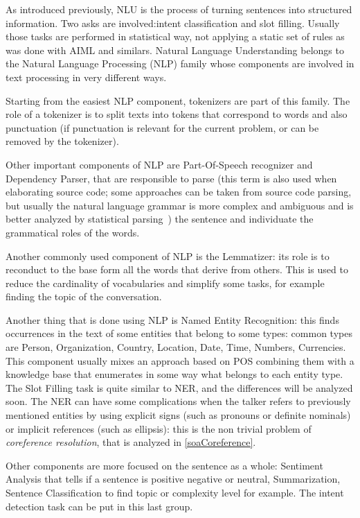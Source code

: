 As introduced previously, NLU is the process of turning sentences into structured information. Two asks are involved:intent classification and slot filling. Usually those tasks are performed in statistical way, not applying a static set of rules as was done with AIML and similars. Natural Language Understanding belongs to the Natural Language Processing (NLP) family whose components are involved in text processing in very different ways.

Starting from the easiest NLP component, tokenizers are part of this family. The role of a tokenizer is to split texts into tokens that correspond to words and also punctuation (if punctuation is relevant for the current problem, or can be removed by the tokenizer).

Other important components of NLP are Part-Of-Speech recognizer and Dependency Parser, that are responsible to parse (this term is also used when elaborating source code; some approaches can be taken from source code parsing, but usually the natural language grammar is more complex and ambiguous and is better analyzed by statistical parsing~\cite{ballesteros2015improved}) the sentence and individuate the grammatical roles of the words.

Another commonly used component of NLP is the Lemmatizer: its role is to reconduct to the base form all the words that derive from others. This is used to reduce the cardinality of vocabularies and simplify some tasks, for example finding the topic of the conversation.

Another thing that is done using NLP is Named Entity Recognition: this finds occurrences in the text of some entities that belong to some types: common types are Person, Organization, Country, Location, Date, Time, Numbers, Currencies. This component usually mixes an approach based on POS combining them with a knowledge base that enumerates in some way what belongs to each entity type. The Slot Filling task is quite similar to NER, and the differences will be analyzed soon. The NER can have some complications when the talker refers to previously mentioned entities by using explicit signs (such as pronouns or definite nominals) or implicit references (such as ellipsis): this is the non trivial problem of \textit{coreference resolution}, that is analyzed in \ref{soaCoreference}.

Other components are more focused on the sentence as a whole: Sentiment Analysis that tells if a sentence is positive negative or neutral, Summarization, Sentence Classification to find topic or complexity level for example. The intent detection task can be put in this last group.

